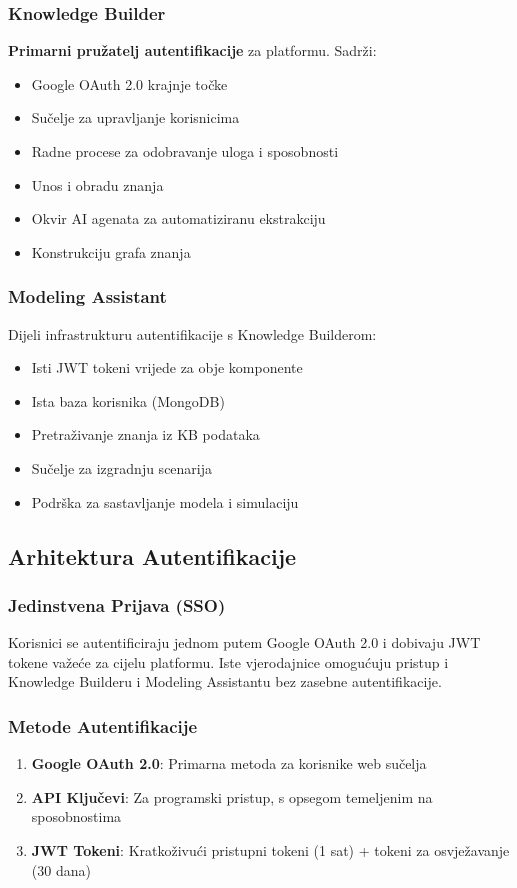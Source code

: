 \documentclass[12pt,a4paper]{article}
\begin{document}
\subsubsection{Knowledge Builder}
\textbf{Primarni pružatelj autentifikacije} za platformu. Sadrži:
\begin{itemize}
    \item Google OAuth 2.0 krajnje točke
    \item Sučelje za upravljanje korisnicima
    \item Radne procese za odobravanje uloga i sposobnosti
    \item Unos i obradu znanja
    \item Okvir AI agenata za automatiziranu ekstrakciju
    \item Konstrukciju grafa znanja
\end{itemize}

\subsubsection{Modeling Assistant}
Dijeli infrastrukturu autentifikacije s Knowledge Builderom:
\begin{itemize}
    \item Isti JWT tokeni vrijede za obje komponente
    \item Ista baza korisnika (MongoDB)
    \item Pretraživanje znanja iz KB podataka
    \item Sučelje za izgradnju scenarija
    \item Podrška za sastavljanje modela i simulaciju
\end{itemize}

\subsection{Arhitektura Autentifikacije}

\subsubsection{Jedinstvena Prijava (SSO)}
Korisnici se autentificiraju jednom putem Google OAuth 2.0 i dobivaju JWT tokene važeće za cijelu platformu. Iste vjerodajnice omogućuju pristup i Knowledge Builderu i Modeling Assistantu bez zasebne autentifikacije.

\subsubsection{Metode Autentifikacije}
\begin{enumerate}
    \item \textbf{Google OAuth 2.0}: Primarna metoda za korisnike web sučelja
    \item \textbf{API Ključevi}: Za programski pristup, s opsegom temeljenim na sposobnostima
    \item \textbf{JWT Tokeni}: Kratkoživući pristupni tokeni (1 sat) + tokeni za osvježavanje (30 dana)
\end{enumerate}
\end{document}

